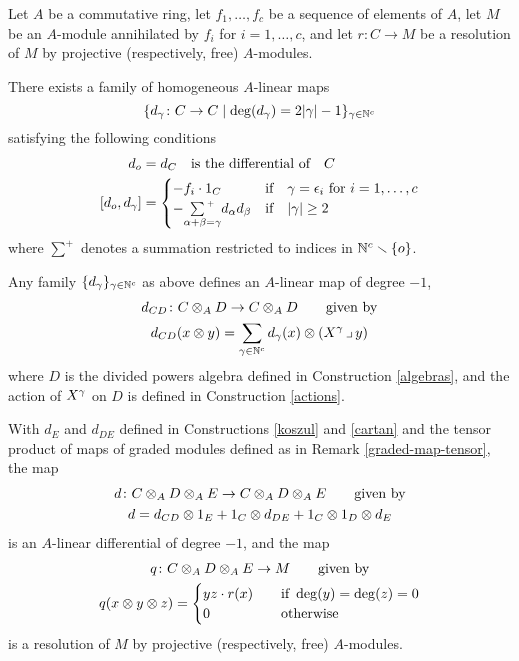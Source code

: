 \begin{theorem}
\label{main}
Let $A$ be a commutative ring, let $f_1 , \dots, f_c$ be a sequence of
elements of $A$, let $M$ be an $A$-module annihilated by $f_i$ for
$i=1,\dots,c$, and let $r \colon  C \to M$ be a resolution of $M$ by
projective (respectively, free) $A$-modules.

There exists a family of homogeneous $A$-linear maps 
\[
\{d_\gamma \colon C \to C\mid \deg(d_\gamma)=2|\gamma| - 1\}_{\gamma \in {\mathbb N}^c}
\]
satisfying the following conditions
\begin{equation}
\label{family}
\begin{aligned}
d_o &= d_C
\quad\text{is the differential of}\quad C\\
[d_o,d_\g] &=
\begin{cases}
-f_i\cdot 1_C &\text{if\quad} \g=\e_i \text{ for } i=1,\dots,c\\
-\ssum{\a+\b=\g}d_\a d_\b      &\text{if\quad} |\g|\ge2
\end{cases}
\end{aligned}
\end{equation}
where $\sum^{\scriptscriptstyle +}$ denotes a summation restricted to
indices in ${\mathbb N}^c\smallsetminus\{o\}$.

Any family $\{d_\gamma\}_{\gamma\in{\mathbb N}^c}$ as above defines an $A$-linear map
of degree $-1$, 
\begin{equation}
\begin{gathered}
\label{dCD}
d_{CD} \colon C\otimes_AD \to C\otimes_AD 
\qquad\text{given by}\\
d_{CD}(x\otimes y) = \sum_{\gamma \in{\mathbb N}^c} d_\gamma(x) \otimes (X^{\gamma} \operatorname{\lrcorner} y)
\end{gathered}
\end{equation}
where $D$ is the divided powers algebra defined in Construction
\ref{algebras}, and the action of $X^{\gamma}$ on $D$ is defined in
Construction \ref{actions}.

With $d_{E}$ and $d_{DE}$ defined in Constructions \ref{koszul} and
\ref{cartan} and the tensor product of maps of graded modules defined
as in Remark \ref{graded-map-tensor},
the map
\begin{equation}
\begin{gathered}
\label{diff}
d\colon C \otimes_A D \otimes_A E \to C \otimes_A D \otimes_A E
\qquad\text{given by}\\
d = d_{CD}\otimes 1_E + 1_C\otimes d_{DE} + 1_C\otimes 1_D\otimes d_E 
\end{gathered}
\end{equation}
is an $A$-linear differential of degree $-1$, and the map
\begin{gather*}
q\colon C \otimes_A D \otimes_A E \to M
\qquad\text{given by}\\
q(x\otimes y\otimes z)=
\begin{cases}
yz\cdot r(x) &\quad\text{if } \deg(y)=\deg(z)=0\\
0      &\quad\text{otherwise}
\end{cases}
\end{gather*}
is a resolution of $M$ by projective (respectively, free) $A$-modules.
 \end{theorem}

